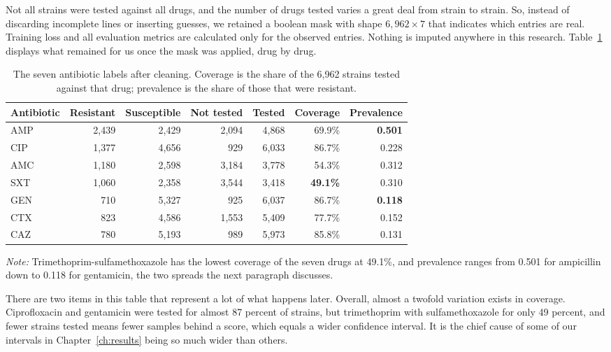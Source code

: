 Not all strains were tested against all drugs, and the number of drugs tested varies a great
deal from strain to strain. So,
instead of discarding incomplete lines or inserting guesses, we retained a boolean mask with
shape $6{,}962 \times 7$ that indicates which entries are real. Training loss and all
evaluation metrics are calculated only for the observed entries. Nothing is imputed anywhere
in this research. Table~\ref{tab:labels} displays what remained for us once the mask was
applied, drug by drug.

\begin{table}[htb]
\centering
\caption{The seven antibiotic labels after cleaning. Coverage is the share of the
6,962 strains tested against that drug; prevalence is the share of those that were
resistant.}
\label{tab:labels}
\small
\setlength{\tabcolsep}{3pt}
\begin{tabular}{|l|r|r|r|r|r|r|}
\hline
\textbf{Antibiotic} & \textbf{Resistant} & \textbf{Susceptible} & \textbf{Not tested} & \textbf{Tested} & \textbf{Coverage} & \textbf{Prevalence} \\
\hline
AMP & 2,439 & 2,429 & 2,094 & 4,868 & 69.9\% & \textbf{0.501} \\ \hline
CIP & 1,377 & 4,656 &   929 & 6,033 & 86.7\% & 0.228 \\ \hline
AMC & 1,180 & 2,598 & 3,184 & 3,778 & 54.3\% & 0.312 \\ \hline
SXT & 1,060 & 2,358 & 3,544 & 3,418 & \textbf{49.1\%} & 0.310 \\ \hline
GEN &   710 & 5,327 &   925 & 6,037 & 86.7\% & \textbf{0.118} \\ \hline
CTX &   823 & 4,586 & 1,553 & 5,409 & 77.7\% & 0.152 \\ \hline
CAZ &   780 & 5,193 &   989 & 5,973 & 85.8\% & 0.131 \\ \hline
\end{tabular}
\vspace{0.4em}

\noindent\footnotesize\textit{Note:} Trimethoprim-sulfamethoxazole has the lowest coverage of
the seven drugs at 49.1\%, and prevalence ranges from 0.501 for ampicillin down to 0.118 for
gentamicin, the two spreads the next paragraph discusses.
\end{table}

There are two items in this table that represent a lot of what happens later. Overall, almost
a twofold variation exists in coverage. Ciprofloxacin and gentamicin were tested for almost 87
percent of strains, but trimethoprim with sulfamethoxazole for only 49 percent, and fewer
strains tested means fewer samples behind a score, which equals a wider confidence interval.
It is the chief cause of some of our intervals in Chapter~\ref{ch:results} being so much wider
than others.


